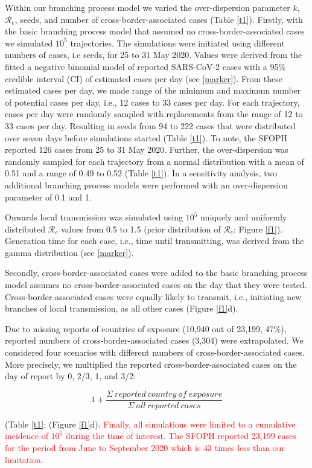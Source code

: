 \documentclass[10pt, a4paper, twoside]{article}
\begin{document}
\begin{multicols}{2}
Within our branching process model we varied the over-dispersion parameter $k$, $\mathcal{R}_e$, seeds, and number of cross-border-associated cases (Table \ref{t1}).
Firstly, with the basic branching process model that assumed no cross-border-associated cases we simulated $10^5$ trajectories.
The simulations were initiated using different numbers of cases, i.e seeds, for 25 to 31 May 2020.
Values were derived from the fitted a negative binomial model of reported SARS-CoV-2 cases with a 95\% credible interval (CI) of estimated cases per day (see \ref{marker}).
From these estimated cases per day, we made range of the minimum and maximum number of potential cases per day, i.e., 12 cases to 33 cases per day. 
For each trajectory, cases per day were randomly sampled with replacements from the range of 12 to 33 cases per day.
Resulting in seeds from 94 to 222 cases that were distributed over seven days before simulations started (Table \ref{t1}).
To note, the SFOPH reported 126 cases from 25 to 31 May 2020.
Further, the over-dispersion was randomly sampled for each trajectory from a normal distribution with a mean of 0.51 and a range of 0.49 to 0.52 (Table \ref{t1}).\cite{laxminarayan_epidemiology_2020}
In a sensitivity analysis, two additional branching process models were performed with an over-dispersion parameter of 0.1 and 1.\cite{taube_open-access_2021}

Onwards local transmission was simulated using $10^5$ uniquely and uniformly distributed $\mathcal{R}_e$ values from 0.5 to 1.5 (prior distribution of $\mathcal{R}_e$; Figure \ref{f1}).
Generation time for each case, i.e., time until transmitting, was derived from the gamma distribution (see \ref{marker}).

Secondly, cross-border-associated cases were added to the basic branching process model assumes no cross-border-associated cases on the day that they were tested.
Cross-border-associated cases were equally likely to transmit, i.e., initiating new branches of local transmission, as all other cases (Figure \ref{f1}d).

Due to missing reports of countries of exposure (10,940 out of 23,199, 47\%), reported numbers of cross-border-associated cases (3,304) were extrapolated.
We considered four scenarios with different numbers of cross-border-associated cases.
More precisely, we multiplied the reported cross-border-associated cases on the day of report by 0, 2/3, 1, and 3/2:
\begin{small} \[ 1+ {\frac{\Sigma~reported ~country ~of ~exposure }{\Sigma~all ~reported ~cases}}\] \end{small} (Table \ref{t1}; (Figure \ref{f1}d).
\textcolor{red}{Finally, all simulations were limited to a cumulative incidence of $10^6$ during the time of interest.
The SFOPH reported 23,199 cases for the period from June to September 2020 which is 43 times less than our limitation.}


\end{multicols}
\end{document}
